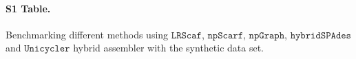 \documentclass[10pt,letterpaper]{article}
\newcommand{\npscarf}{$\mathtt{npScarf}$}
\newcommand{\npgraph}{$\mathtt{npGraph}$}
\newcommand{\unicycler}{$\mathtt{Unicycler}$}
\newcommand{\lrscaf}{$\mathtt{LRScaf}$}
\begin{document}
\clearpage
\paragraph*{S1 Table.}
\label{S1_Table}
Benchmarking different methods using \lrscaf{}, \npscarf{}, \npgraph{}, $\mathtt{hybridSPAdes}$ and \unicycler{} hybrid assembler with the synthetic data set.

\makeatletter

\newlength\oriarrayrulewidth  
\newcount\orilowpenalty
\newcommand\nobreakmidrule{%
 \noalign{\global\oriarrayrulewidth\arrayrulewidth\relax
          \global\orilowpenalty\@lowpenalty\relax  
          \global\@lowpenalty=\numexpr-10000\relax%
          \global\arrayrulewidth\lightrulewidth\relax}
 \hline
 \noalign{\global\@lowpenalty=\orilowpenalty\relax%
          \global\arrayrulewidth\oriarrayrulewidth\relax}}

\makeatother
\setlength{\LTleft}{-1in}
\setcounter{table}{0}  
\end{document}
